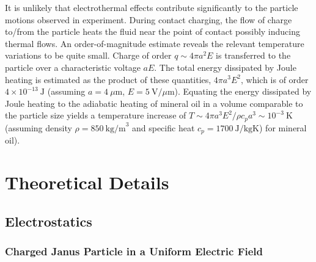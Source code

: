 \begin{appendices}
It is unlikely that electrothermal effects contribute significantly to the particle motions observed in experiment.
During contact charging, the flow of charge to/from the particle heats the fluid near the point of contact possibly inducing thermal flows. 
An order-of-magnitude estimate reveals the relevant temperature variations to be quite small.  
Charge of order $q\sim4\pi a^2 E$ is transferred to the particle over a characteristic voltage $aE$. 
The total energy dissipated by Joule heating is estimated as the product of these quantities, $4\pi a^3 E^2$, which is of order $4\times10^{-13}~\text{J}$ (assuming $a = 4~\mu\text{m}$, $E = 5~\text{V/}\mu\text{m}$).  
Equating the energy dissipated by Joule heating to the adiabatic heating of mineral oil in a volume comparable to the particle size yields a temperature increase of $T\sim4\pi a^3E^2/\rho c_p a^3\sim 10^{-3}~\text{K}$ (assuming density $\rho = 850~\text{kg/m}^3$ and specific heat $c_p = 1700~\text{J/kgK}$) for mineral oil).







\section{Theoretical Details}

\subsection{Electrostatics}

\subsubsection{Charged Janus Particle in a Uniform Electric Field}
\label{sec:unbounded}


\end{appendices}
